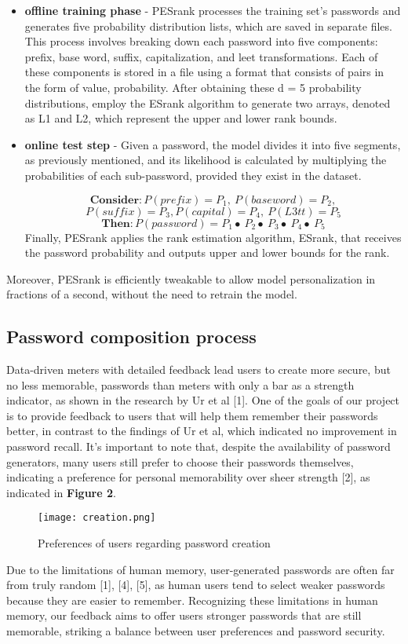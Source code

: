 \documentclass[5p,twocolumn]{elsarticle}
\begin{document}
\begin{itemize}
    \item \textbf{offline training phase} - PESrank processes the training set's passwords and generates five probability distribution lists, which are saved in separate files. This process involves breaking down each password into five components: prefix, base word, suffix, capitalization, and leet transformations. Each of these components is stored in a file using a format that consists of pairs in the form of {value, probability}. After obtaining these d = 5 probability distributions, employ the ESrank algorithm to generate two arrays, denoted as L1 and L2, which represent the upper and lower rank bounds.\item \textbf{online test step} -  Given a password, the model divides it into five segments, as previously mentioned, and its likelihood is calculated by multiplying the probabilities of each sub-password, provided they exist in the dataset.

\[\textbf{Consider}: P(prefix) = P_1,\ P(base word) = P_2,
\]
\[P(suffix) = P_3, P(capital) = P_4,\ P(L3tt) = P_5\]
\[\textbf{Then}: P(password) = P_1\bullet\ P_2\bullet\ P_3\bullet\ P_4\bullet\ P_5\]
Finally, PESrank applies the rank estimation algorithm, ESrank, that receives the password probability and outputs upper and lower bounds for the rank. 
\end{itemize}

Moreover, PESrank is efficiently tweakable to allow model personalization in fractions of a second, without the need to retrain the model.
\subsection{\textbf{Password composition process}}
Data-driven meters with detailed feedback lead users to create more secure, but no less memorable, passwords than meters with only a bar as a strength indicator, as shown in the research by Ur et al [1]. One of the goals of our project is to provide feedback to users that will help them remember their passwords better, in contrast to the findings of Ur et al, which indicated no improvement in password recall. It's important to note that, despite the availability of password generators, many users still prefer to choose their passwords themselves, indicating a preference for personal memorability over sheer strength [2], as indicated in \textbf{Figure 2}. 
\begin{figure}[h]
	\centering 
	\texttt{[image: creation.png]}
 \caption{Preferences of users regarding password creation}
	\label{fig_mom0}%
\end{figure}
Due to the limitations of human memory, user-generated passwords are often far from truly random [1], [4], [5], as human users tend to select weaker passwords because they are easier to remember. Recognizing these limitations in human memory, our feedback aims to offer users stronger passwords that are still memorable, striking a balance between user preferences and password security. 
\end{document}

